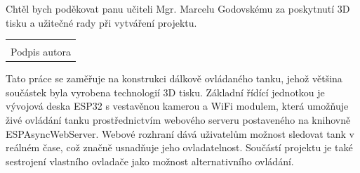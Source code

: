 \documentclass[12pt, a4paper,
oneside
openany
]{report}
\newcommand\datumOdevzdani{1. 1. 2024} %
\begin{document}
	

    \newpage
    \noindent Chtěl bych  poděkovat panu učiteli Mgr. Marcelu Godovskému za poskytnutí 3D tisku a užitečné rady při vytváření projektu.


	\vspace*{0.6\textheight} %




	\vfill
	\noindent{V Opavě \datumOdevzdani\\}
	\noindent
	\begin{minipage}{\linewidth}
		\hspace{9.5cm} 
		\begin{tabular}{@{}p{6cm}@{}}
			\dotfill \\
			Podpis autora
		\end{tabular}
	\end{minipage}
	
	\clearpage %


    	\noindent Tato práce se zaměřuje na konstrukci dálkově ovládaného tanku, jehož většina součástek byla vyrobena technologií 3D tisku. Základní řídící jednotkou je vývojová deska ESP32 s vestavěnou kamerou a WiFi modulem, která umožňuje živé ovládání tanku prostřednictvím webového serveru postaveného na knihovně ESPAsyncWebServer. Webové rozhraní dává uživatelům možnost sledovat tank v reálném čase, což značně usnadňuje jeho ovladatelnost. Součástí projektu je také sestrojení vlastního ovladače jako možnost alternativního ovládání. \\
	
\end{document}
